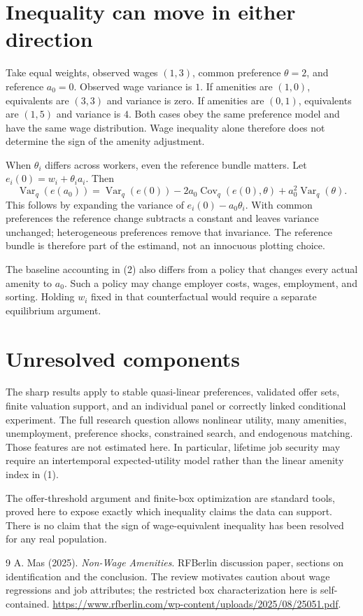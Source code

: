 \documentclass[11pt,a4paper]{article}
\DeclareMathOperator{\Var}{Var}
\DeclareMathOperator{\Cov}{Cov}
\begin{document}
\section{Inequality can move in either direction}
Take equal weights, observed wages $(1,3)$, common preference $\theta=2$, and reference $a_0=0$. Observed wage variance is $1$. If amenities are $(1,0)$, equivalents are $(3,3)$ and variance is zero. If amenities are $(0,1)$, equivalents are $(1,5)$ and variance is $4$. Both cases obey the same preference model and have the same wage distribution. Wage inequality alone therefore does not determine the sign of the amenity adjustment.

When $\theta_i$ differs across workers, even the reference bundle matters. Let $e_i(0)=w_i+\theta_i a_i$. Then
\[
 \Var_q(e(a_0))
 =\Var_q(e(0))-2a_0\Cov_q(e(0),\theta)
       +a_0^2\Var_q(\theta).
 \tag{5}
\]
This follows by expanding the variance of $e_i(0)-a_0\theta_i$. With common preferences the reference change subtracts a constant and leaves variance unchanged; heterogeneous preferences remove that invariance. The reference bundle is therefore part of the estimand, not an innocuous plotting choice.

The baseline accounting in (2) also differs from a policy that changes every actual amenity to $a_0$. Such a policy may change employer costs, wages, employment, and sorting. Holding $w_i$ fixed in that counterfactual would require a separate equilibrium argument.
\section{Unresolved components}
The sharp results apply to stable quasi-linear preferences, validated offer sets, finite valuation support, and an individual panel or correctly linked conditional experiment. The full research question allows nonlinear utility, many amenities, unemployment, preference shocks, constrained search, and endogenous matching. Those features are not estimated here. In particular, lifetime job security may require an intertemporal expected-utility model rather than the linear amenity index in (1).

The offer-threshold argument and finite-box optimization are standard tools, proved here to expose exactly which inequality claims the data can support. There is no claim that the sign of wage-equivalent inequality has been resolved for any real population.
\begin{thebibliography}{9}
 A. Mas (2025). \emph{Non-Wage Amenities}.
RFBerlin discussion paper, sections on identification and the conclusion.
The review motivates caution about wage regressions and job attributes; the restricted box characterization here is self-contained.
\url{https://www.rfberlin.com/wp-content/uploads/2025/08/25051.pdf}.
\end{thebibliography}
\end{document}
